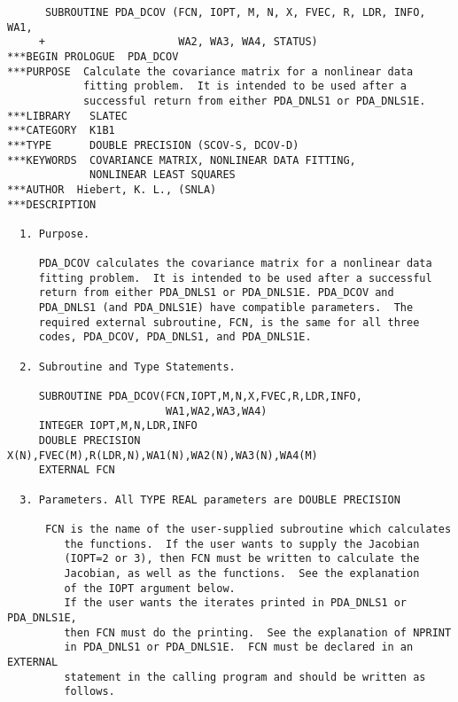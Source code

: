 \begin{verbatim}
      SUBROUTINE PDA_DCOV (FCN, IOPT, M, N, X, FVEC, R, LDR, INFO, WA1, 
     +                     WA2, WA3, WA4, STATUS)
***BEGIN PROLOGUE  PDA_DCOV
***PURPOSE  Calculate the covariance matrix for a nonlinear data
            fitting problem.  It is intended to be used after a
            successful return from either PDA_DNLS1 or PDA_DNLS1E.
***LIBRARY   SLATEC
***CATEGORY  K1B1
***TYPE      DOUBLE PRECISION (SCOV-S, DCOV-D)
***KEYWORDS  COVARIANCE MATRIX, NONLINEAR DATA FITTING,
             NONLINEAR LEAST SQUARES
***AUTHOR  Hiebert, K. L., (SNLA)
***DESCRIPTION

  1. Purpose.

     PDA_DCOV calculates the covariance matrix for a nonlinear data
     fitting problem.  It is intended to be used after a successful
     return from either PDA_DNLS1 or PDA_DNLS1E. PDA_DCOV and
     PDA_DNLS1 (and PDA_DNLS1E) have compatible parameters.  The
     required external subroutine, FCN, is the same for all three
     codes, PDA_DCOV, PDA_DNLS1, and PDA_DNLS1E.

  2. Subroutine and Type Statements.

     SUBROUTINE PDA_DCOV(FCN,IOPT,M,N,X,FVEC,R,LDR,INFO,
                         WA1,WA2,WA3,WA4)
     INTEGER IOPT,M,N,LDR,INFO
     DOUBLE PRECISION X(N),FVEC(M),R(LDR,N),WA1(N),WA2(N),WA3(N),WA4(M)
     EXTERNAL FCN

  3. Parameters. All TYPE REAL parameters are DOUBLE PRECISION

      FCN is the name of the user-supplied subroutine which calculates
         the functions.  If the user wants to supply the Jacobian
         (IOPT=2 or 3), then FCN must be written to calculate the
         Jacobian, as well as the functions.  See the explanation
         of the IOPT argument below.
         If the user wants the iterates printed in PDA_DNLS1 or PDA_DNLS1E,
         then FCN must do the printing.  See the explanation of NPRINT
         in PDA_DNLS1 or PDA_DNLS1E.  FCN must be declared in an EXTERNAL
         statement in the calling program and should be written as
         follows.


\end{verbatim}
